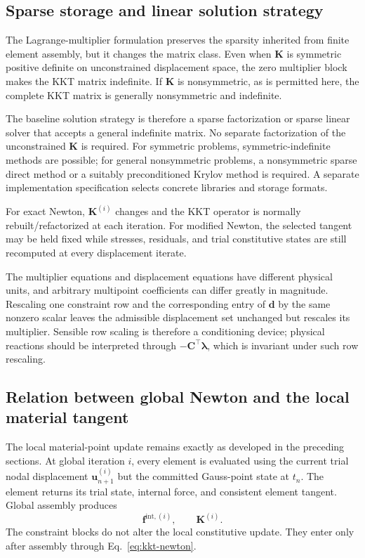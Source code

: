 \documentclass[11pt,a4paper]{article}
\newcommand{\vct}[1]{\mathbf{#1}}
\begin{document}
\subsection{Sparse storage and linear solution strategy}

The Lagrange-multiplier formulation preserves the sparsity inherited from finite element assembly, but it changes the matrix class. Even when $\vct K$ is symmetric positive definite on unconstrained displacement space, the zero multiplier block makes the KKT matrix indefinite. If $\vct K$ is nonsymmetric, as is permitted here, the complete KKT matrix is generally nonsymmetric and indefinite.

The baseline solution strategy is therefore a sparse factorization or sparse linear solver that accepts a general indefinite matrix. No separate factorization of the unconstrained $\vct K$ is required. For symmetric problems, symmetric-indefinite methods are possible; for general nonsymmetric problems, a nonsymmetric sparse direct method or a suitably preconditioned Krylov method is required. A separate implementation specification selects concrete libraries and storage formats.

For exact Newton, $\vct K^{(i)}$ changes and the KKT operator is normally rebuilt/refactorized at each iteration. For modified Newton, the selected tangent may be held fixed while stresses, residuals, and trial constitutive states are still recomputed at every displacement iterate.

The multiplier equations and displacement equations have different physical units, and arbitrary multipoint coefficients can differ greatly in magnitude. Rescaling one constraint row and the corresponding entry of $\vct d$ by the same nonzero scalar leaves the admissible displacement set unchanged but rescales its multiplier. Sensible row scaling is therefore a conditioning device; physical reactions should be interpreted through $-\vct C^\top\vct\lambda$, which is invariant under such row rescaling.

\subsection{Relation between global Newton and the local material tangent}

The local material-point update remains exactly as developed in the preceding sections. At global iteration $i$, every element is evaluated using the current trial nodal displacement $\vct u_{n+1}^{(i)}$ but the committed Gauss-point state at $t_n$. The element returns its trial state, internal force, and consistent element tangent. Global assembly produces
\begin{equation}
\vct f^{\mathrm{int},(i)},
\qquad
\vct K^{(i)}.
\end{equation}
The constraint blocks do not alter the local constitutive update. They enter only after assembly through Eq.~\eqref{eq:kkt-newton}.
\end{document}
